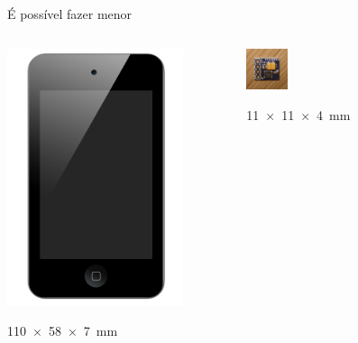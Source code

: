 \documentclass{beamer}
\begin{document}
\begin{frame}{É possível fazer menor}
	\begin{columns}
		\pause
		\begin{center}
			\includegraphics[width=0.8\textwidth]{img/IPod_touch_4G.png}

			\SI[product-units=single]{110 x 58 x 7}{\milli\metre}
		\end{center}

		\pause
		\begin{center}
			\includegraphics[width=0.19\textwidth]{../monografia/img/sensor_front.jpg}

			\SI[product-units=single]{11 x 11 x 4}{\milli\metre}
		\end{center}
	\end{columns}
\end{frame}
\end{document}
